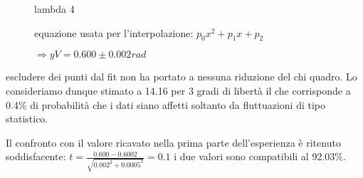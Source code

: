\documentclass[a4paper]{article}
\theoremstyle{definition}
\begin{document}
\begin{figure}[!htbp]
    	\captionsetup{labelformat=empty}
        \caption{lambda 4}
    \end{figure}
    
\begin{figure}[!ht]
        	\captionsetup{labelformat=empty}

		\caption{equazione usata per l'interpolazione: $p_{0}x^{2} + p_{1}x + p_{2}$}
	\caption{ $ \Rightarrow yV = 0.600 \pm 0.002rad$}

\end{figure}
\noindent escludere dei punti dal fit non ha portato a nessuna riduzione del chi quadro. Lo consideriamo dunque stimato a 14.16 per 3 gradi di libertà il che corrisponde a 0.4\% di probabilità che i dati siano affetti soltanto da fluttuazioni di tipo statistico.

\noindent Il confronto con il valore ricavato nella prima parte dell'esperienza è ritenuto soddisfacente: \( t = \frac{0.600- 0.6002}{\sqrt{  0.002^{2}+0.0005^{2}  }} = 0.1\) i due valori sono compatibili al 92.03\%.
\end{document}
